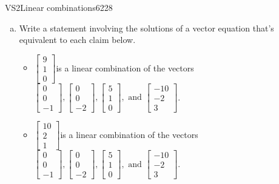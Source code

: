 \begin{exercise}{VS2}{Linear combinations}{6228} 
\begin{exerciseStatement} 

\begin{enumerate}[(a)]
\item  

 Write a statement involving the solutions of a vector equation that's equivalent to each claim below. 

 

\begin{itemize}
\item  

 \(\left[\begin{array}{c}
9 \\
1 \\
0
\end{array}\right]\)is a linear combination of the vectors \(\left[\begin{array}{c}
0 \\
0 \\
-1
\end{array}\right] , \left[\begin{array}{c}
0 \\
0 \\
-2
\end{array}\right] , \left[\begin{array}{c}
5 \\
1 \\
0
\end{array}\right] , \text{ and } \left[\begin{array}{c}
-10 \\
-2 \\
3
\end{array}\right]\). 

 
\item  

 \(\left[\begin{array}{c}
10 \\
2 \\
1
\end{array}\right]\)is a linear combination of the vectors \(\left[\begin{array}{c}
0 \\
0 \\
-1
\end{array}\right] , \left[\begin{array}{c}
0 \\
0 \\
-2
\end{array}\right] , \left[\begin{array}{c}
5 \\
1 \\
0
\end{array}\right] , \text{ and } \left[\begin{array}{c}
-10 \\
-2 \\
3
\end{array}\right]\). 


\end{itemize}
\end{enumerate}
\end{exerciseStatement}
\end{exercise}
